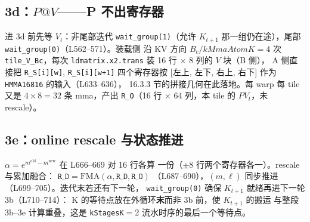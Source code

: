 \subsection{3d：$P@V$——P 不出寄存器}





进 3d 前先等 $V_t$：非尾部迭代 \texttt{wait\_\allowbreak{}group\allowbreak{}(1)}（允许 $K_{t+1}$
那一组仍在途），尾部 \texttt{wait\_\allowbreak{}group\allowbreak{}(0)}（L562--571）。装载侧
沿 KV 方向 $B_c/kMmaAtomK=4$ 次 \texttt{tile\_V\_Bc}，每次
\texttt{ldmatrix.\allowbreak{}x2.trans} 装 16 行 $\times$ 8 列的 $V$ 块（B 侧），
A 侧直接把 \texttt{R\_S[i][w]}, \texttt{R\_S[i][w+1]} 四个寄存器按
[左上, 左下, 右上, 右下] 作为 \texttt{HMMA16816} 的输入（L633--636），
16.3.3 节的拼接几何在此落地。每 warp 每 tile 又是 $4\times 8=32$ 条
mma，产出 \texttt{R\_O}（16 行 $\times$ 64 列，本 tile 的
$P V_t$，未 rescale）。

\subsection{3e：online rescale 与状态推进}







$\alpha = e^{m^{\text{old}}-m^{\text{new}}}$ 在 L666--669 对 16 行各算
一份（$\pm 8$ 行两个寄存器各一）。rescale 与累加融合：
$\texttt{R\_D} = \mathrm{FMA}(\alpha, \texttt{R\_D}, \texttt{R\_O})$
（L687--690），$(m,\ell)$ 同步推进（L699--705）。迭代末若还有下一轮，
\texttt{wait\_\allowbreak{}group\allowbreak{}(0)} 确保 $K_{t+1}$ 就绪再进下一轮 3b（L710--714）：
K 的等待点放在外循环\textbf{末}而非 3b 前，使 $K_{t+1}$ 的搬运
与整段 3b--3e 计算重叠，这是 \texttt{kStagesK}$=$2 流水时序的最后一个等待点。

